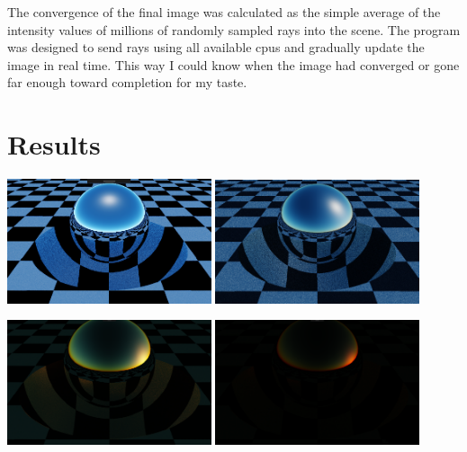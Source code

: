 \documentclass[12pt, letterpaper]{article}
\begin{document}
The convergence of the final image was calculated as the simple average of the
intensity values of millions of randomly sampled rays into the scene. The
program was designed to send rays using all available cpus and gradually update
the image in real time. This way I could know when the image had converged or
gone far enough toward completion for my taste.

\section{Results}

\begin{center}
  \includegraphics[width=0.45\textwidth]{day}
  \includegraphics[width=0.45\textwidth]{afternoon}
\end{center}
\begin{center}
  \includegraphics[width=0.45\textwidth]{sunset}
  \includegraphics[width=0.45\textwidth]{evening}
\end{center}
\end{document}

